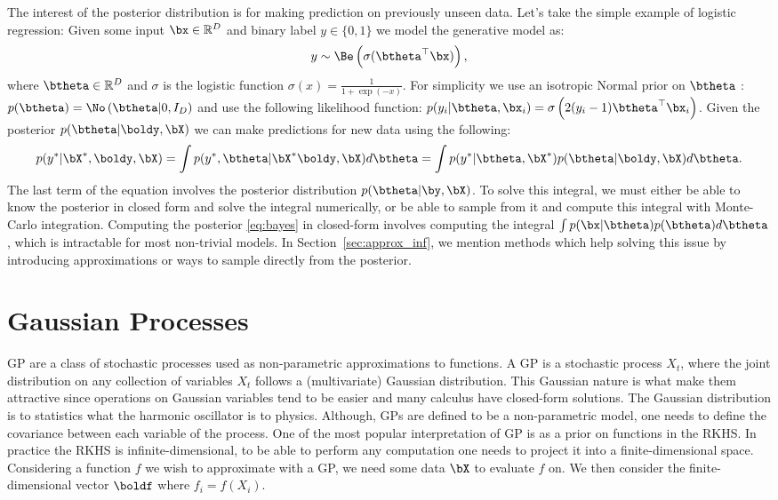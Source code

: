 The interest of the posterior distribution is for making prediction on previously unseen data.
Let's take the simple example of logistic regression:
Given some input $\bx \in \mathbb{R}^D$ and binary label $y\in \{ 0, 1\}$ we model the generative model as:
\begin{align}
y \sim \Be\left(\sigma(\btheta^\top \bx)\right),
\end{align}
where $\btheta\in\mathbb{R}^D$ and $\sigma$ is the logistic function $\sigma(x) = \frac{1}{1+\exp(-x)}$.
For simplicity we use an isotropic Normal prior on $\btheta$ : $p(\btheta) = \No\left(\btheta|0, I_{D}\right)$ and use the following likelihood function: $p(y_i|\btheta,\bx_i) =\sigma\left(2(y_i - 1) \btheta^\top \bx_i\right)$.
Given the posterior $p(\btheta|\boldy, \bX)$ we can make predictions for new data using the following:
\begin{align}
p(y^*|\bX^*,\boldy,\bX) = \int p(y^*, \btheta|\bX^*\boldy, \bX)d\btheta = \int p(y^*|\btheta,\bX^*) p(\btheta|\boldy,\bX)d\btheta.
\end{align}
The last term of the equation involves the posterior distribution $p(\btheta|\by,\bX)$.
To solve this integral, we must either be able to know the posterior in closed form and solve the integral numerically, or be able to sample from it and compute this integral with Monte-Carlo integration.
Computing the posterior \eqref{eq:bayes} in closed-form involves computing the integral $\int p(\bx|\btheta)p(\btheta)d\btheta$, which is intractable for most non-trivial models.
In Section~\ref{sec:approx_inf}, we mention methods which help solving this issue by introducing approximations or ways to sample directly from the posterior.

\section{Gaussian Processes}

\ac{GP} are a class of stochastic processes used as non-parametric approximations to functions.
A \ac{GP} is a stochastic process $X_t$, where the joint distribution on any collection of variables $X_t$ follows a (multivariate) Gaussian distribution.
This Gaussian nature is what make them attractive since operations on Gaussian variables tend to be easier and many calculus have closed-form solutions.
The Gaussian distribution is to statistics what the harmonic oscillator is to physics.
Although, \ac{GPs} are defined to be a non-parametric model, one needs to define the covariance between each variable of the process.
One of the most popular interpretation of \ac{GP} is as a prior on functions in the \acf{RKHS}.
In practice the \ac{RKHS} is infinite-dimensional, to be able to perform any computation one needs to project it into a finite-dimensional space.
Considering a function $f$ we wish to approximate with a \ac{GP}, we need some data $\bX$ to evaluate $f$ on.
We then consider the finite-dimensional vector $\boldf$ where $f_i = f(X_i)$.


